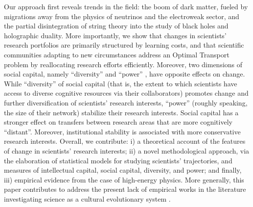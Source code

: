 \documentclass{article}
\begin{document}
Our approach first reveals trends in the field: the boom of dark matter, fueled by migrations away from the physics of neutrinos and the electroweak sector, and the partial disintegration of string theory into the study of black holes and holographic duality. More importantly, we show that changes in scientists' research portfolios are primarily structured by learning costs, and that scientific communities adapting to new circumstances address an Optimal Transport problem by reallocating research efforts efficiently. Moreover, two dimensions of social capital, namely ``diversity'' and ``power'' \citep{Abbasi2014}, have opposite effects on change. While ``diversity'' of social capital (that is, the extent to which scientists have access to diverse cognitive resources via their collaborators) promotes change and further diversification of scientists' research interests, ``power'' (roughly speaking, the size of their network) stabilize their research interests. Social capital has a stronger effect on transfers between research areas that are more cognitively ``distant''. Moreover, institutional stability is associated with more conservative research interests. %
Overall, we contribute: i) a theoretical account of the features of change in scientists' research interests; ii) a novel methodological approach, via the elaboration of statistical models for studying scientists' trajectories, and measures of intellectual capital, social capital, diversity, and power; and finally, iii) empirical evidence from the case of high-energy physics. More generally, this paper contributes to address the present lack of empirical works in the literature investigating science as a cultural evolutionary system \citep{Wu2023}.
\end{document}
